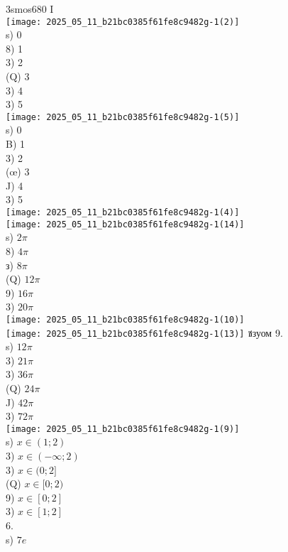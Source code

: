\documentclass[10pt]{article}
\begin{document}
3smos680 I\\
\texttt{[image: 2025\_05\_11\_b21bc0385f61fe8c9482g-1(2)]}\\
s) 0\\
8) 1\\
3) 2\\
(Q) 3\\
3) 4\\
3) 5\\
\texttt{[image: 2025\_05\_11\_b21bc0385f61fe8c9482g-1(5)]}\\
s) 0\\
B) 1\\
3) 2\\
(œ) 3\\
J) 4\\
3) 5\\
\texttt{[image: 2025\_05\_11\_b21bc0385f61fe8c9482g-1(4)]}\\
\texttt{[image: 2025\_05\_11\_b21bc0385f61fe8c9482g-1(14)]}\\
s) $2 \pi$\\
8) $4 \pi$\\
з) $8 \pi$\\
(Q) $12 \pi$\\
9) $16 \pi$\\
3) $20 \pi$\\
\texttt{[image: 2025\_05\_11\_b21bc0385f61fe8c9482g-1(10)]}\\
\texttt{[image: 2025\_05\_11\_b21bc0385f61fe8c9482g-1(13)]} ชзуом 9.\\
s) $12 \pi$\\
3) $21 \pi$\\
3) $36 \pi$\\
(Q) $24 \pi$\\
J) $42 \pi$\\
3) $72 \pi$\\
\texttt{[image: 2025\_05\_11\_b21bc0385f61fe8c9482g-1(9)]}\\
s) $x \in(1 ; 2)$\\
3) $x \in(-\infty ; 2)$\\
3) $x \in(0 ; 2]$\\
(Q) $x \in[0 ; 2)$\\
9) $x \in[0 ; 2]$\\
3) $x \in[1 ; 2]$\\
6.\\
s) $7 e$\\
\end{document}
